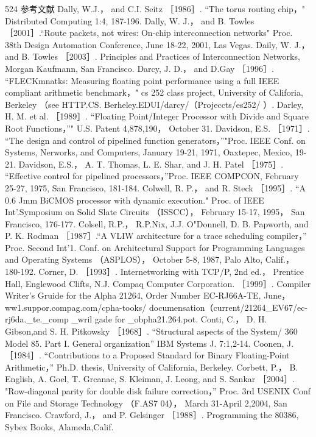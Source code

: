 524
参考文献
Dally, W.J.， and C.I. Seitz ［1986］. “The torus routing chip，" Distributed Computing 1:4, 187-196.
Dally, W. J.， and B. Towles ［2001］.“Route packets, not wires: On-chip interconnection networks" Proc. 38th Design Automation
Conference, June 18-22, 2001, Las Vegas.
Daily, W. J.， and B. Towles ［2003］. Principles and Practices of Interconnection Networks, Morgan Kaufmann, San Francisco.
Darcy, J. D.， and D.Gay ［1996］. “FLECKmnatks: Measuring floating point performance using a full IEEE compliant arithmetic
benchmark，" cs 252 class project, University of Califoria, Berkeley （see HTTP.CS. Berheley.EDUI/darcy/（Projeccts/es252/ ）.
Darley, H. M. et al. ［1989］. “Floating Point/Integer Processor with Divide and Square Root Functions，”" U.S. Patent 4,878,190，
October 31.
Davidson, E.S. ［1971］. “The design and control of pipelined function generators，”"Proc. IEEE Conf. on Systems, Nerworks, and
Computers, January 19-21, 1971, Oaxtepec, Mexico, 19-21.
Davidson, E.S.， A. T. Thomas, L. E. Shar, and J. H. Patel ［1975］. “Effective control for pipelined processors，”Proc. IEEE
COMPCON, February 25-27, 1975, San Francisco, 181-184. Colwell, R. P.， and R. Steck ［1995］. “A 0.6 Jmm BiCMOS
processor with dynamic execution." Proc. of IEEE Int'.Symposium on Solid Slate Circuits （ISSCC）， February 15-17, 1995，
San Francisco, 176-177.
Colsell, R.P.， R.P.Nix, J.J. O"Donnell, D. B. Papworth, and P. K. Rodman ［1987］.“A VLIW architecture for a trace scheduling
compiler，” Proc. Second Int'1. Conf. on Architectural Support for Programming Languages and Operating Systems （ASPLOS），
October 5-8, 1987, Palo Alto, Calif.， 180-192.
Corner, D. ［1993］. Internetworking with TCP/P, 2nd ed.， Prentice Hall, Englewood Clifts, N.J.
Compaq Computer Corporation. ［1999］. Compiler Writer's Gruide for the Alpha 21264, Order Number EC-RJ66A-TE, June，
ww1.suppor.compag.com/cpha-tooks/ documensation（current/21264_EV67/ec-rj6da._te._comp _wril gade for _obpha21.264.pot.
Conti, C.， D. H. Gibson,and S. H. Pitkowsky ［1968］. “Structural aspects of the System/ 360 Model 85. Part I. General
organization” IBM Systems J. 7:1,2-14.
Coonen, J.［1984］. “Contributions to a Proposed Standard for Binary Floating-Point Arithmetic，” Ph.D. thesis, University of
California, Berkeley.
Corbett, P.， B. English, A. Goel, T. Grcanac, S. Kleiman, J. Leong, and S. Sankar ［2004］. "Row-diagonal parity for double disk
failure correction，” Proc. 3rd USENIX Conf on File and Storage Technology （F.AS7 04）， March 31-April 2,2004, San Francisco.
Crawford, J.， and P. Gelsinger ［1988］. Programming the 80386, Sybex Books, Alameda,Calif.
